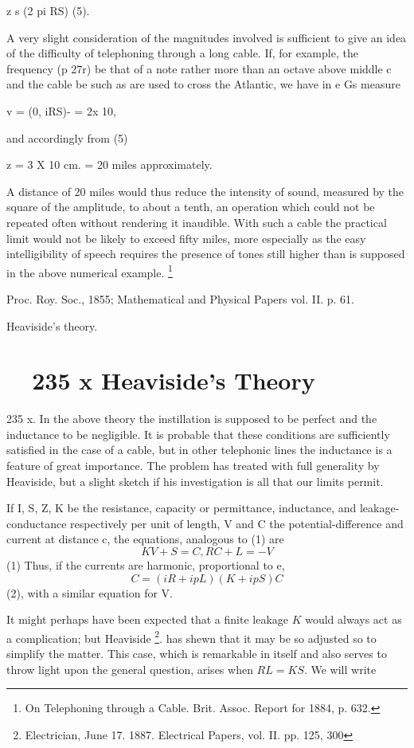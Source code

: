 z s (2 pi RS) (5).

A very slight consideration of the magnitudes involved is
sufficient to give an idea of the difficulty of telephoning through a
long cable. If, for example, the frequency (p 27r) be that of a
note rather more than an octave above middle c and the cable be
such as are used to cross the Atlantic, we have in e Gs measure

v = (0, iRS)- = 2x 10,

and accordingly from (5)

z = 3 X 10 cm. = 20 miles approximately.

A distance of 20 miles would thus reduce the intensity of
sound, measured by the square of the amplitude, to about a
tenth, an operation which could not be repeated often without
rendering it inaudible. With such a cable the practical limit
would not be likely to exceed fifty miles, more especially as
the easy intelligibility of speech requires the presence of tones
still higher than is supposed in the above numerical example.
\footnote{On Telephoning through a Cable. Brit. Assoc. Report for 1884, p. 632.}

Proc. Roy. Soc., 1855; Mathematical and Physical Papers vol. II. p. 61.


Heaviside's theory.
\section{~~235 x Heaviside's Theory}
235 x. In the above theory the instillation is supposed to be
perfect and the inductance to be negligible. It is probable that
these conditions are sufficiently satisfied in the case of a cable,
but in other telephonic lines the inductance is a feature of great
importance. The problem has treated with full generality by Heaviside, but a
slight sketch if his investigation is all that our limits permit.

If I, S, Z, K be the resistance, capacity or permittance, inductance, and
leakage-conductance respectively per unit of length,
V and C the potential-difference and current at distance c, the
equations, analogous to (1) are
\[ KV + S = C, RC + L = -V\]
(1) Thus, if the currents are harmonic, proportional to e,
\[ C = (iR + ipL ) (K + ipS) C\]
(2), with a similar equation for V.

It might perhaps have been expected that a finite leakage \(K\)
would always act as a complication; but Heaviside
\footnote{Electrician, June 17. 1887. Electrical Papers, vol. II. pp. 125, 300}.
has shewn that it may be so adjusted so to simplify the matter. This case,
which is remarkable in itself and also serves to throw light upon
the general question, arises when \(RL=KS\). We will write

